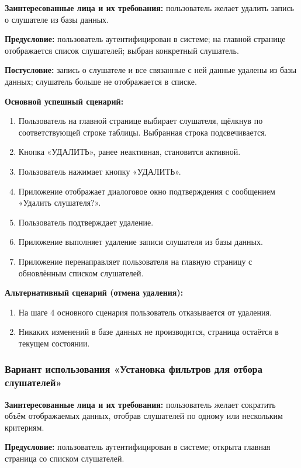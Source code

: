 \textbf{Заинтересованные лица и их требования:} пользователь желает удалить запись о слушателе из базы данных.

\textbf{Предусловие:} пользователь аутентифицирован в системе; на главной странице отображается список слушателей; выбран конкретный слушатель.

\textbf{Постусловие:} запись о слушателе и все связанные с ней данные удалены из базы данных; слушатель больше не отображается в списке.

\textbf{Основной успешный сценарий:}
\begin{enumerate}
	\item Пользователь на главной странице выбирает слушателя, щёлкнув по соответствующей строке таблицы. Выбранная строка подсвечивается.
	\item Кнопка «УДАЛИТЬ», ранее неактивная, становится активной.
	\item Пользователь нажимает кнопку «УДАЛИТЬ».
	\item Приложение отображает диалоговое окно подтверждения с сообщением «Удалить слушателя?».
	\item Пользователь подтверждает удаление.
	\item Приложение выполняет удаление записи слушателя из базы данных.
	\item Приложение перенаправляет пользователя на главную страницу с обновлённым списком слушателей.
\end{enumerate}

\textbf{Альтернативный сценарий (отмена удаления):}
\begin{enumerate}
	\item На шаге 4 основного сценария пользователь отказывается от удаления.
	\item Никаких изменений в базе данных не производится, страница остаётся в текущем состоянии.
\end{enumerate}

\subsubsection{Вариант использования «Установка фильтров для отбора слушателей»}

\textbf{Заинтересованные лица и их требования:} пользователь желает сократить объём отображаемых данных, отобрав слушателей по одному или нескольким критериям.

\textbf{Предусловие:} пользователь аутентифицирован в системе; открыта главная страница со списком слушателей.

